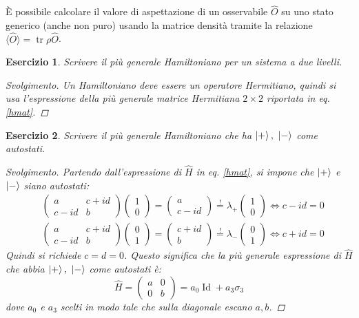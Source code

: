 \documentclass[11pt, a4paper]{scrartcl} %
\numberwithin{equation}{subsection}
\theoremstyle{style2}
\theoremstyle{style1}
\newtheorem{esercizio}{Esercizio}[section]
\renewcommand\qedsymbol{$\blacksquare$}
\newenvironment{svolgimento}{\renewcommand\qedsymbol{$\spadesuit$}\begin{proof}[Svolgimento]}{\end{proof}}
\begin{document}
\`E possibile calcolare il valore di aspettazione di un osservabile $\hat{O}$ su uno stato generico (anche non puro) usando la matrice densit\`a tramite la relazione $\langle \hat{O} \rangle = \operatorname{tr} \rho  \hat{O}$.
\begin{esercizio}
	Scrivere il pi\`u generale Hamiltoniano per un sistema a due livelli.
	\begin{svolgimento}
		Un Hamiltoniano deve essere un operatore Hermitiano, quindi si usa l'espressione della pi\`u generale matrice Hermitiana $2\times 2$ riportata in eq. \ref{hmat}.
	\end{svolgimento}
\end{esercizio}
\begin{esercizio}
	Scrivere il pi\`u generale Hamiltoniano che ha $\ket{+} , \  \ket{-} $ come autostati.
	\begin{svolgimento}
		Partendo dall'espressione di $\hat{H}$ in eq. \ref{hmat}, si impone che $\ket{+} $ e $\ket{-} $ siano autostati:
		\[
		\begin{split}
			&\begin{pmatrix} a & c+ id \\ c-id & b \end{pmatrix} \begin{pmatrix} 1 \\0 \end{pmatrix}= \begin{pmatrix} a \\ c-id \end{pmatrix}  \stackrel{!}{=} \lambda_+ \begin{pmatrix} 1\\0 \end{pmatrix} \iff c-id = 0\\
			&\begin{pmatrix} a & c+id \\ c-id & b \end{pmatrix} \begin{pmatrix} 0\\1 \end{pmatrix} = \begin{pmatrix} c+id \\ b \end{pmatrix} \stackrel{!}{=} \lambda _- \begin{pmatrix} 0 \\1 \end{pmatrix} \iff c+id = 0
		\end{split}
		\] 
		Quindi si richiede $c=d = 0$. 
		Questo significa che la pi\`u generale espressione di $\hat{H}$ che abbia $\ket{+} , \ \ket{-} $ come autostati \`e:
	\begin{equation}
		\hat{H} = \begin{pmatrix} a  &  0 \\ 0 &  b \end{pmatrix} = a_0 \operatorname{Id} + a_3 \sigma _3
	\end{equation}	
	dove $a_0$ e $a_3$ scelti in modo tale che sulla diagonale escano $a,b$.
	\end{svolgimento}
\end{esercizio}
\end{document}
